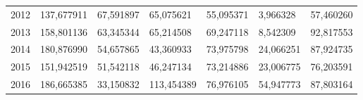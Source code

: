 \begin{table}
\begin{tabular}{p{1cm}p{2cm}p{2cm}p{2cm}p{2cm}p{2cm}p{2cm}}
 2012 &      137,677911 &                67,591897 &        65,075621 &                 55,095371 &       3,966328 &                      57,460260 \\
 2013 &      158,801136 &                63,345344 &        65,214508 &                 69,247118 &       8,542309 &                      92,817553 \\
 2014 &      180,876990 &                54,657865 &        43,360933 &                 73,975798 &      24,066251 &                      87,924735 \\
 2015 &      151,942519 &                51,542118 &        46,247134 &                 73,214886 &      23,006775 &                      76,203591 \\
 2016 &      186,665385 &                33,150832 &       113,454389 &                 76,976105 &      54,947773 &                      87,803164 \\
\bottomrule
\end{tabular}
\end{table}
